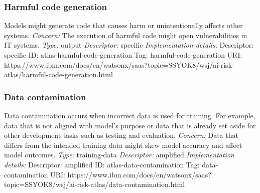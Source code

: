 \documentclass{article}
\begin{document}
\subsubsection*{Harmful code generation}
Models might generate code that causes harm or unintentionally affects other systems.\newline
\textit{Concern: }The execution of harmful code might open vulnerabilities in IT systems.\newline\newline
\textit{Type: }output\newline
\textit{Descriptor: }specific \newline\newline
\textit{Implementation details:} \newline
Descriptor: specific \newline
ID: atlas-harmful-code-generation \newline
Tag: harmful-code-generation \newline
URI:  https://www.ibm.com/docs/en/watsonx/saas?topic=SSYOK8/wsj/ai-risk-atlas/harmful-code-generation.html\newline
\subsubsection*{Data contamination}
Data contamination occurs when incorrect data is used for training. For example, data that is not aligned with model's purpose or data that is already set aside for other development tasks such as testing and evaluation.\newline
\textit{Concern: }Data that differs from the intended training data might skew model accuracy and affect model outcomes.\newline\newline
\textit{Type: }training-data\newline
\textit{Descriptor: }amplified \newline\newline
\textit{Implementation details:} \newline
Descriptor: amplified \newline
ID: atlas-data-contamination \newline
Tag: data-contamination \newline
URI:  https://www.ibm.com/docs/en/watsonx/saas?topic=SSYOK8/wsj/ai-risk-atlas/data-contamination.html\newline
\end{document}
